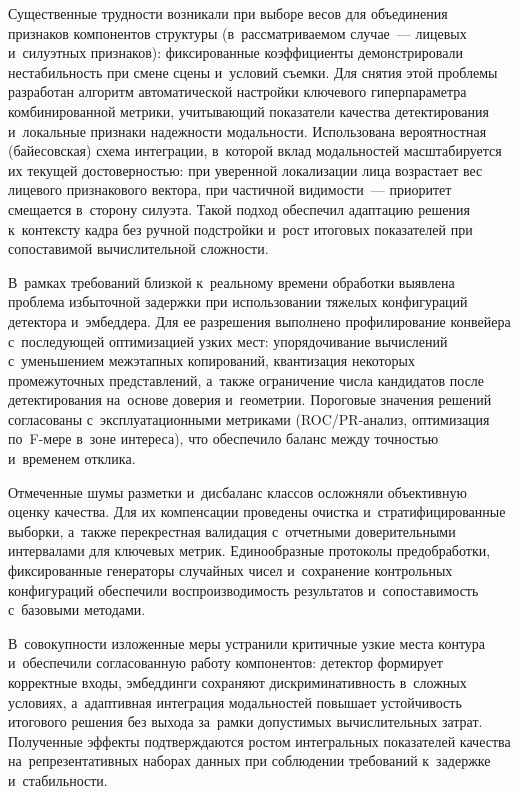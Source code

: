 Существенные трудности возникали при выборе весов для объединения
признаков компонентов структуры (в~рассматриваемом случае~--- лицевых
и~силуэтных признаков): фиксированные коэффициенты
демонстрировали нестабильность при смене сцены и~условий съемки.
Для снятия этой проблемы разработан алгоритм автоматической настройки
ключевого гиперпараметра комбинированной метрики, учитывающий
показатели качества детектирования и~локальные признаки надежности
модальности. Использована вероятностная (байесовская) схема
интеграции, в~которой вклад модальностей масштабируется их текущей
достоверностью: при уверенной локализации лица возрастает вес
лицевого признакового вектора, при частичной видимости~--- приоритет
смещается в~сторону силуэта. Такой подход обеспечил адаптацию решения
к~контексту кадра без ручной подстройки и~рост итоговых показателей
при сопоставимой вычислительной сложности.

В~рамках требований близкой к~реальному времени обработки выявлена
проблема избыточной задержки при использовании тяжелых конфигураций
детектора и~эмбеддера. Для ее разрешения выполнено профилирование
конвейера с~последующей оптимизацией узких мест: упорядочивание
вычислений с~уменьшением межэтапных копирований, квантизация
некоторых промежуточных представлений, а~также ограничение числа
кандидатов после детектирования на~основе доверия и~геометрии.
Пороговые значения решений согласованы с~эксплуатационными метриками
(ROC/PR-анализ, оптимизация по~F-мере в~зоне интереса), что
обеспечило баланс между точностью и~временем отклика.

Отмеченные шумы разметки и~дисбаланс классов осложняли объективную
оценку качества. Для их компенсации проведены очистка
и~стратифицированные выборки, а~также перекрестная валидация
с~отчетными доверительными интервалами для ключевых метрик.
Единообразные протоколы предобработки, фиксированные генераторы
случайных чисел и~сохранение контрольных конфигураций обеспечили
воспроизводимость результатов и~сопоставимость с~базовыми методами.

В~совокупности изложенные меры устранили критичные узкие места
контура и~обеспечили согласованную работу компонентов: детектор
формирует корректные входы, эмбеддинги сохраняют дискриминативность
в~сложных условиях, а~адаптивная интеграция модальностей повышает
устойчивость итогового решения без выхода за~рамки допустимых
вычислительных затрат. Полученные эффекты подтверждаются ростом
интегральных показателей качества на~репрезентативных наборах данных
при соблюдении требований к~задержке и~стабильности.
